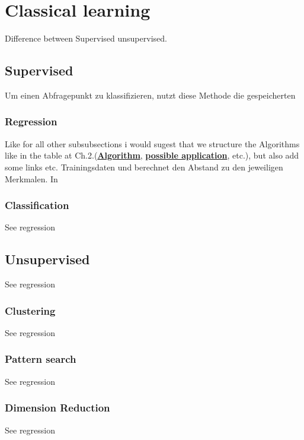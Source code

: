 \section{Classical learning}
Difference between Supervised unsupervised.



\subsection{Supervised}
Um einen Abfragepunkt zu klassifizieren, nutzt diese Methode die gespeicherten


\subsubsection{Regression}
Like for all other subsubsections i would sugest that we structure the Algorithms like in the table at Ch.2.(\textbf{\underline{Algorithm}}, \textbf{\underline{possible application}}, etc.), but also add some links etc. Trainingsdaten und berechnet den Abstand zu den jeweiligen Merkmalen. In 
 

\subsubsection{Classification}
See regression

\subsection{Unsupervised}
See regression


\subsubsection{Clustering}
See regression
 

\subsubsection{Pattern search}
See regression

\subsubsection{Dimension Reduction}
See regression

 


\newpage